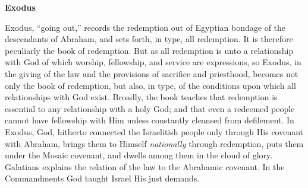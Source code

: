 \documentclass[10pt,landscape,twocolumn,letterpaper]{article}
\begin{document}
\begin{center}
\textbf{Exodus}
\end{center}
Exodus, ``going out,'' records the redemption out of Egyptian bondage of the descendants of Abraham, and sets forth, in type, all redemption. It is therefore peculiarly the book of redemption.  But as all redemption is unto a relationship with God of which worship, fellowship, and service are expressions, so Exodus, in the giving of the law and the provisions of sacrifice and priesthood, becomes not only the book of redemption, but also, in type, of the conditions upon which all relationships with God exist.  Broadly, the book teaches that redemption is essential to any relationship with a holy God; and that even a redeemed people cannot have fellowship with Him unless constantly cleansed from defilement.  In Exodus, God, hitherto connected the Israelitish people only through His covenant with Abraham, brings them to Himself \emph{nationally} through redemption, puts them under the Mosaic covenant, and dwells among them in the cloud of glory.  Galatians explains the relation of the law to the Abrahamic covenant.  In the Commandments God taught Israel His just demands.
\end{document}
